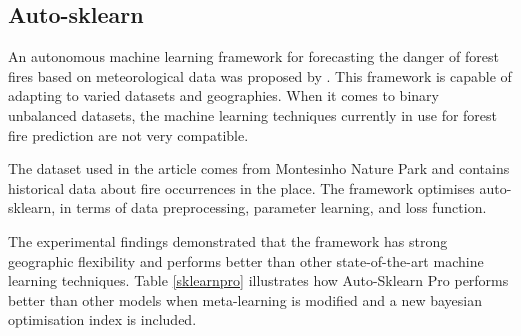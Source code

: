 \subsection{Auto-sklearn}
An autonomous machine learning framework for forecasting the danger of forest fires based on meteorological data was proposed by \cite{Qu_2020}. This framework is capable of adapting to varied datasets and geographies. When it comes to binary unbalanced datasets, the machine learning techniques currently in use for forest fire prediction are not very compatible. 


The dataset used in the article comes from Montesinho Nature Park \cite{misc_forest_fires_162} and contains historical data about fire occurrences in the place. The framework optimises auto-sklearn, in terms of data preprocessing, parameter learning, and loss function.


The experimental findings demonstrated that the framework has strong geographic flexibility and performs better than other state-of-the-art machine learning techniques. Table \ref{sklearnpro} illustrates how Auto-Sklearn Pro performs better than other models when meta-learning is modified and a new bayesian optimisation index is included.




\begin{table}[h!]
\caption{Forest district classifier accuracy comparison}
\centering
{}

\label{sklearnpro}
\end{table}


